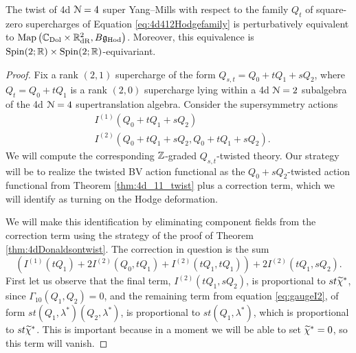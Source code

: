 \documentclass[10pt, oneside]{article}
\newcommand{\Hod}{\mathrm{Hod}}
\begin{document}
\begin{theorem}
The twist of 4d $\mathcal N=4$ super Yang--Mills with respect to the family $Q_t$ of square-zero supercharges of Equation \ref{eq:4d412Hodgefamily} is perturbatively equivalent to $\map\left(\CC_{\rm Dol} \times \RR^2_{\mr{dR}}, B\fg_{\Hod}\right)$. Moreover, this equivalence is $\mathrm{Spin}(2;\mathbb R) \times \mathrm{Spin}(2;\mathbb R)$-equivariant.
\end{theorem}

\begin{proof}
Fix a rank $(2,1)$ supercharge of the form $Q_{s,t} = Q_0 + tQ_1 + sQ_2$, where $Q_t = Q_0 + tQ_1$ is a rank $(2,0)$ supercharge lying within a 4d $\mathcal{N}=2$ subalgebra of the 4d $\mathcal{N}=4$ supertranslation algebra.  Consider the supersymmetry actions 
\begin{align*}
&I^{(1)}(Q_0 + tQ_1 + sQ_2) \\
&I^{(2)}(Q_0 + tQ_1 + sQ_2, Q_0 + tQ_1 + sQ_2).
\end{align*}
We will compute the corresponding $\mathbb Z$-graded $Q_{s,t}$-twisted theory.  Our strategy will be to realize the twisted BV action functional as the $Q_0 + sQ_2$-twisted action functional from Theorem \ref{thm:4d_11_twist} plus a correction term, which we will identify as turning on the Hodge deformation.

We will make this identification by eliminating component fields from the correction term using the strategy of the proof of Theorem \ref{thm:4dDonaldsontwist}.  The correction in question is the sum
\begin{equation}
\label{eq:4d_12_general_def}
\left(I^{(1)}(tQ_1) + 2 I^{(2)}(Q_0, tQ_1) + I^{(2)}(tQ_1, tQ_1)\right) + 2I^{(2)}(tQ_1, sQ_2).
\end{equation}
First let us observe that the final term, $I^{(2)}(tQ_1, sQ_2)$, is proportional to $st \widetilde{\chi}^*$, since $\Gamma_{10}(Q_1,Q_2) = 0$, and the remaining term from equation \ref{eq:gaugeI2}, of form $st(Q_1,\lambda^*)(Q_2,\lambda^*)$, is proportional to $st (Q_1,\lambda^*)$, which is proportional to $st \widetilde{\chi}^*$.  This is important because in a moment we will be able to set $\widetilde{\chi}^* = 0$, so this term will vanish.


\end{proof}
\end{document}
